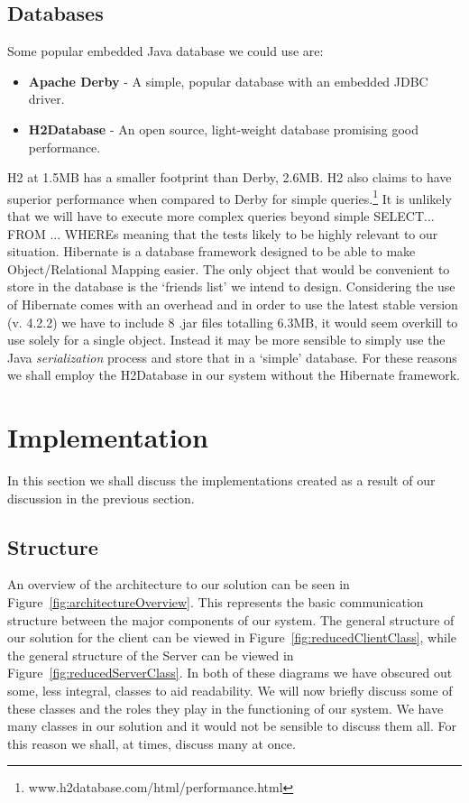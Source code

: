 \documentclass[12pt, titlepage]{article}
\begin{document}
\subsection{Databases}
Some popular embedded Java database we could use are:
\begin{itemize}
	\item \textbf{Apache Derby} - A simple, popular database with an embedded JDBC driver.
	\item \textbf{H2Database} - An open source, light-weight database promising good performance.
\end{itemize}
H2 at 1.5MB has a smaller footprint than Derby, 2.6MB. H2 also claims to have superior performance when compared to Derby for simple queries.\footnote{www.h2database.com/html/performance.html} It is unlikely that we will have to execute more complex queries beyond simple SELECT... FROM ... WHEREs meaning that the tests likely to be highly relevant to our situation.
\newline \indent Hibernate is a database framework designed to be able to make Object/Relational Mapping easier. The only object that would be convenient to store in the database is the `friends list' we intend to design. Considering the use of Hibernate comes with an overhead and in order to use the latest stable version (v. 4.2.2) we have to include 8 .jar files totalling 6.3MB, it would seem overkill to use solely for a single object. Instead it may be more sensible to simply use the Java \textit{serialization} process and store that in a `simple' database.
\newline \indent For these reasons we shall employ the H2Database in our system without the Hibernate framework.

\newpage
\section{Implementation}
In this section we shall discuss the implementations created as a result of our discussion in the previous section.
\subsection{Structure}
An overview of the architecture to our solution can be seen in Figure~\ref{fig:architectureOverview}. This represents the basic communication structure between the major components of our system.
\newline \indent The general structure of our solution for the client can be viewed in Figure~\ref{fig:reducedClientClass}, while the general structure of the Server can be viewed in Figure~\ref{fig:reducedServerClass}. In both of these diagrams we have obscured out some, less integral, classes to aid readability.
\newline \indent We will now briefly discuss some of these classes and the roles they play in the functioning of our system. We have many classes in our solution and it would not be sensible to discuss them all. For this reason we shall, at times, discuss many at once.
 
\end{document}
